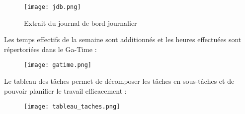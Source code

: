 \begin{figure}[H]
    \centering
    \texttt{[image: jdb.png]}
    \caption{Extrait du journal de bord journalier}
\end{figure}

Les temps effectifs de la semaine sont additionnés et les heures effectuées sont répertoriées dans le Ga-Time :

\begin{figure}[H]
    \centering
    \texttt{[image: gatime.png]}
\end{figure}

Le tableau des tâches permet de décomposer les tâches en sous-tâches et de pouvoir planifier le travail efficacement :

\begin{figure}[H]
    \centering
    \texttt{[image: tableau\_taches.png]}
\end{figure}






  
